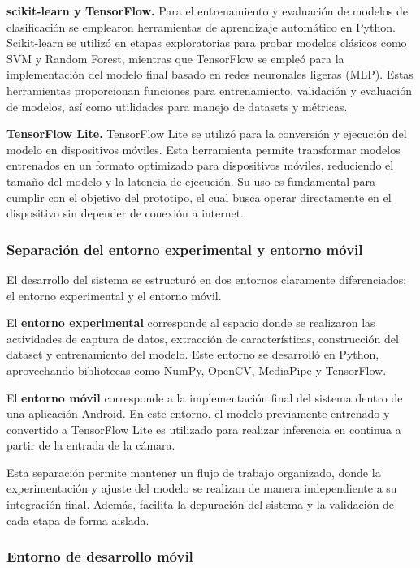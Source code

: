 	\textbf{scikit-learn y TensorFlow.}  
	Para el entrenamiento y evaluación de modelos de clasificación se emplearon herramientas de aprendizaje automático en Python. Scikit-learn se utilizó en etapas exploratorias para probar modelos clásicos como SVM y Random Forest, mientras que TensorFlow se empleó para la implementación del modelo final basado en redes neuronales ligeras (MLP). Estas herramientas proporcionan funciones para entrenamiento, validación y evaluación de modelos, así como utilidades para manejo de datasets y métricas.
	
	\textbf{TensorFlow Lite.}  
	TensorFlow Lite se utilizó para la conversión y ejecución del modelo en dispositivos móviles. Esta herramienta permite transformar modelos entrenados en un formato optimizado para dispositivos móviles, reduciendo el tamaño del modelo y la latencia de ejecución. Su uso es fundamental para cumplir con el objetivo del prototipo, el cual busca operar directamente en el dispositivo sin depender de conexión a internet.
	
	\subsubsection{Separación del entorno experimental y entorno móvil}
	
	El desarrollo del sistema se estructuró en dos entornos claramente diferenciados: el entorno experimental y el entorno móvil.
	
	El \textbf{entorno experimental} corresponde al espacio donde se realizaron las actividades de captura de datos, extracción de características, construcción del dataset y entrenamiento del modelo. Este entorno se desarrolló en Python, aprovechando bibliotecas como NumPy, OpenCV, MediaPipe y TensorFlow.
	
	El \textbf{entorno móvil} corresponde a la implementación final del sistema dentro de una aplicación Android. En este entorno, el modelo previamente entrenado y convertido a TensorFlow Lite es utilizado para realizar inferencia en continua a partir de la entrada de la cámara.
	
	Esta separación permite mantener un flujo de trabajo organizado, donde la experimentación y ajuste del modelo se realizan de manera independiente a su integración final. Además, facilita la depuración del sistema y la validación de cada etapa de forma aislada.
	
	\subsubsection{Entorno de desarrollo móvil}
	
